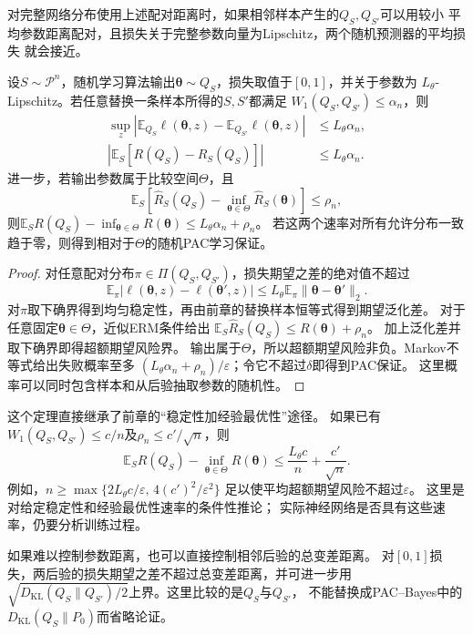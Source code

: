 对完整网络分布使用上述配对距离时，如果相邻样本产生的$Q_S,Q_{S'}$可以用较小
平均参数距离配对，且损失关于完整参数向量为Lipschitz，两个随机预测器的平均损失
就会接近。

\begin{theorem}[参数分布稳定性与期望泛化差]
\label{thm:distribution-stability-generalization}
设$S\sim\mathcal P^n$，随机学习算法输出$\bm\theta\sim Q_S$，损失取值于$[0,1]$，并关于参数为
$L_\theta$-Lipschitz。若任意替换一条样本所得的$S,S'$都满足
$W_1(Q_S,Q_{S'})\leq\alpha_n$，则
\[
 \begin{aligned}
 \sup_z\left|\mathbb E_{Q_S}\ell(\bm\theta,z)
              -\mathbb E_{Q_{S'}}\ell(\bm\theta,z)\right|
 &\leq L_\theta\alpha_n,\\
 \left|\mathbb E_S[R(Q_S)-\hat R_S(Q_S)]\right|
 &\leq L_\theta\alpha_n.
 \end{aligned}
\]
进一步，若输出参数属于比较空间$\Theta$，且
\[
 \mathbb E_S\left[\hat R_S(Q_S)-\inf_{\bm\theta\in\Theta}
                           \hat R_S(\bm\theta)\right]\leq\rho_n,
\]
则$\mathbb E_S R(Q_S)-\inf_{\bm\theta\in\Theta}R(\bm\theta)
\leq L_\theta\alpha_n+\rho_n$。
若这两个速率对所有允许分布一致趋于零，则得到相对于$\Theta$的随机PAC学习保证。
\end{theorem}
\begin{proof}
对任意配对分布$\pi\in\Pi(Q_S,Q_{S'})$，损失期望之差的绝对值不超过
\[
 \mathbb E_\pi|\ell(\bm\theta,z)-\ell(\bm\theta',z)|
 \leq L_\theta\mathbb E_\pi\|\bm\theta-\bm\theta'\|_2.
\]
对$\pi$取下确界得到均匀稳定性，再由前章的替换样本恒等式得到期望泛化差。
对于任意固定$\bm\theta\in\Theta$，近似ERM条件给出
$\mathbb E_S\hat R_S(Q_S)\leq R(\bm\theta)+\rho_n$。
加上泛化差并取下确界即得超额期望风险界。
输出属于$\Theta$，所以超额期望风险非负。Markov不等式给出失败概率至多
$(L_\theta\alpha_n+\rho_n)/\varepsilon$；令它不超过$\delta$即得到PAC保证。
这里概率可以同时包含样本和从后验抽取参数的随机性。
\end{proof}

这个定理直接继承了前章的“稳定性加经验最优性”途径。
如果已有$W_1(Q_S,Q_{S'})\leq c/n$及$\rho_n\leq c'/\sqrt n$，则
\[
 \mathbb E_S R(Q_S)-\inf_{\bm\theta\in\Theta}R(\bm\theta)
 \leq\frac{L_\theta c}{n}+\frac{c'}{\sqrt n}.
\]
例如，$n\geq\max\{2L_\theta c/\varepsilon,\,4(c')^2/\varepsilon^2\}$
足以使平均超额期望风险不超过$\varepsilon$。
这里是对给定稳定性和经验最优性速率的条件性推论；
实际神经网络是否具有这些速率，仍要分析训练过程。

如果难以控制参数距离，也可以直接控制相邻后验的总变差距离。
对$[0,1]$损失，两后验的损失期望之差不超过总变差距离，并可进一步用
$\sqrt{D_{\mathrm{KL}}(Q_S\|Q_{S'})/2}$上界。这里比较的是$Q_S$与$Q_{S'}$，
不能替换成PAC--Bayes中的$D_{\mathrm{KL}}(Q_S\|P_0)$而省略论证。

